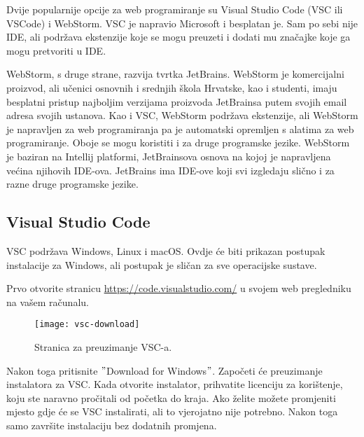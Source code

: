 Dvije popularnije opcije za web programiranje su Visual Studio Code (VSC ili VSCode) i WebStorm.
VSC je napravio Microsoft i besplatan je.
Sam po sebi nije IDE, ali podržava ekstenzije koje se mogu preuzeti i dodati mu značajke koje ga mogu pretvoriti u IDE\@.

WebStorm, s druge strane, razvija tvrtka JetBrains.
WebStorm je komercijalni proizvod, ali učenici osnovnih i srednjih škola Hrvatske, kao i studenti, imaju besplatni pristup najboljim verzijama proizvoda JetBrainsa putem svojih email adresa svojih ustanova.
Kao i VSC, WebStorm podržava ekstenzije, ali WebStorm je napravljen za web programiranja pa je automatski opremljen s alatima za web programiranje.
Oboje se mogu koristiti i za druge programske jezike.
WebStorm je baziran na Intellij platformi, JetBrainsova osnova na kojoj je napravljena većina njihovih IDE-ova.
JetBrains ima IDE-ove koji svi izgledaju slično i za razne druge programske jezike.

\subsection{Visual Studio Code}\label{subsec:visual-studio-code}

VSC podržava Windows, Linux i macOS\@.
Ovdje će biti prikazan postupak instalacije za Windows, ali postupak je sličan za sve operacijske sustave.

Prvo otvorite stranicu \href{https://code.visualstudio.com/}{https://code.visualstudio.com/} u svojem web pregledniku na vašem računalu.

\begin{figure}[h]
    \texttt{[image: vsc-download]}
    \caption{Stranica za preuzimanje VSC-a.}\label{fig:figure8}
\end{figure}

Nakon toga pritisnite \("\)Download for Windows\("\).
Započeti će preuzimanje instalatora za VSC\@.
Kada otvorite instalator, prihvatite licenciju za korištenje, koju ste naravno pročitali od početka do kraja.
Ako želite možete promjeniti mjesto gdje će se VSC instalirati, ali to vjerojatno nije potrebno.
Nakon toga samo završite instalaciju bez dodatnih promjena.

